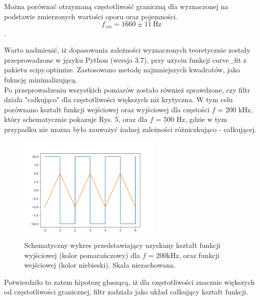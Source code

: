 \documentclass[10pt,a4paper]{article}
\begin{document}
Można porównać otrzymaną częstotliwość graniczną dla wyznaczonej na podstawie zmierzonych wartości oporu oraz pojemności. 
$$ f_{zm} = 1660 \pm 11 \ \text{Hz} $$.

Warto nadmienić, iż dopasowania zależności wyznaczonych teoretycznie zostały przeprowadzone w języku Python (wersja 3.7), przy użyciu funkcji curve\_fit z pakietu scipy.optimize. Zastosowano metodę najmniejszych kwadratów, jako fukncję minimalizującą. \\

Po przeprowadzeniu wszystkich pomiarów zostało również sprawdzone, czy filtr działa "całkująco" dla częstotliwości większych niż krytyczna. W tym celu porównano kształt funkcji wejściowej oraz wyjściowej dla częstości $f$ = 200 kHz, który schematycznie pokazuje Rys. 5, oraz dla $f$ = 500 Hz, gdzie w tym przypadku nie można było zauważyć żadnej zależności różniczkująco - całkującej. 

\begin{figure}[ht!]	
	\begin{center}
		\includegraphics[width = 0.6\textwidth]{calka.png}
		\caption{Schematyczny wykres przedstawiający uzyskany kształt funkcji wyjściowej (kolor pomarańczowy) dla $f$ = 200kHz, oraz funkcji wejściowej (kolor niebieski). Skala niezachowana.}
	\end{center}
\end{figure}	

Potwierdziło to zatem hipotezę głoszącą, iż dla częstotliwości znacznie większych od częstotliwości granicznej, filtr zadziała jako układ całkujący kształt funkcji.
\end{document}
